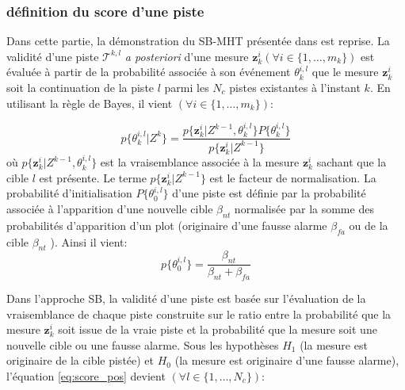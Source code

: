 \documentclass[10pt,french,a4paper]{report}
\begin{document}
			 \subsubsection{définition du score d'une piste}
			 Dans cette partie, la démonstration du SB-MHT présentée dans \cite{Demos1990} est reprise. La validité d'une piste $\mathcal{T}^{k,l}$ \textit{a posteriori} d'une mesure  $\mathbf{z}_k^i (\forall i \in \{1,\ldots,m_k\})$ est évaluée à partir de la probabilité associée à son événement $\theta^{i,l}_k$ que le mesure  $\mathbf{z}_k^i$  soit la continuation de la piste $l$ parmi les $N_c$ pistes existantes à l'instant $k$. En utilisant la règle de Bayes, il vient $(\forall i \in \{1,\ldots,m_k\})$:
			 
			  	  	 \begin{equation}
			  	  	 \label{eq:score_pos}
 p\{\theta^{i,l}_k| Z^{k} \}= \frac{p\{\mathbf{z}_k^i| Z^{k-1},\theta^{i,l}_k \}P\{\theta^{i,l}_k\}}{p \{\mathbf{z}_k^i|Z^{k-1} \}}
 	  \end{equation}  
 où  $p\{\mathbf{z}_k^i| Z^{k-1},\theta^{i,l}_k \}$ est la vraisemblance associée à la mesure $\mathbf{z}_k^i$  sachant que la cible $l$ est présente. Le terme $p\{\mathbf{z}_k^i|Z^{k-1} \}$  est le facteur de normalisation. La probabilité d'initialisation $P\{\theta^{i,l}_0\}$ d'une piste est définie par la probabilité   associée à l'apparition d'une nouvelle cible $\beta_{nt}$ normalisée par la somme des probabilités d'apparition d'un plot (originaire d'une fausse alarme $\beta_{fa}$ ou de la cible $\beta_{nt}$ ). Ainsi il vient:
 \begin{equation}
  p\{\theta^{i,l}_0\}= \frac{\beta_{nt}}{\beta_{nt} + \beta_{fa}}
 	  \end{equation}
 
Dans l'approche SB, la validité d'une piste est basée sur l'évaluation de la vraisemblance de chaque piste construite sur le ratio entre la probabilité que la mesure  $\mathbf{z}_k^i$ soit issue de la vraie piste et la probabilité que la mesure soit une nouvelle cible ou une fausse alarme.  Sous les hypothèses $H_1$ (la mesure est originaire de la cible pistée) et $H_0$ (la mesure est originaire d'une fausse alarme), l'équation \ref{eq:score_pos} devient $(\forall l \in \{1,\ldots,N_c\})$:
\end{document}

